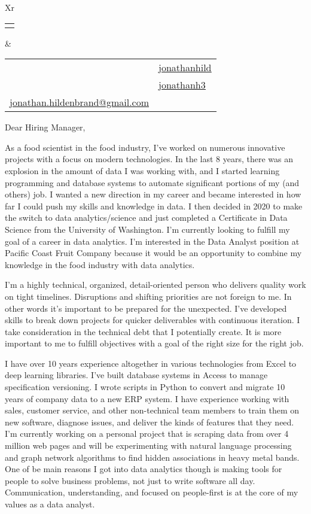 \documentclass[letterpaper,12pt]{article}[leftmargin=*]
\makeatletter
\def\fullname{Jonathan Hildenbrand}
\def\githubicon{\faGithub}
\def\githublink{https://github.com/jonathanhild}
\def\githubtext{jonathanhild}
\def\linkedinicon{\faLinkedin}
\def\linkedinlink{https://linkedin.com/in/jonathanh3}
\def\linkedintext{jonathanh3}
\def\phoneicon{\faPhone}
\def\phonetext{+1-971-409-0695}
\def\emailicon{\faEnvelope}
\def\emaillink{mailto:jonathan.hildenbrand+resume@gmail.com}
\def\emailtext{jonathan.hildenbrand@gmail.com}
\def\locationicon{\faMapMarker}
\def\locationtext{Portland, Oregon}
\def\targeticon{\faBinoculars}
\def\targettext{Local \& Remote}
\def\headertype{\doublecol} %
\def\location{\hspace{3pt}\locationicon \hspace{5pt}{\color{links}\locationtext}}
\def\target{\targeticon\hspace{3pt}{\color{links}\targettext}}
\def\phone{\phoneicon\hspace{3pt}{\color{links}{\phonetext}}}
\def\linkedin{\linkedinicon\hspace{3pt}\href{\linkedinlink}{\underline{\linkedintext}}}
\def\email{\emailicon\hspace{3pt}\href{\emaillink}{\underline{\emailtext}}}
\def\github{\githubicon\hspace{3pt}\href{\githublink}{\underline{\githubtext}}}
\newcommand{\doublecol}[6]{
  \begin{tabularx}{\textwidth}{Xr}
    {
      \begin{tabular}[c]{l}
        \fontsize{24}{34}\selectfont{\color{primary}{{\textbf{\fullname}}}}
      \end{tabular}
    } & {
      \begin{tabular}[c]{l@{\hspace{1.5em}} l}
        {\small#4} & {\small#1} \\
        {\small#5} & {\small#2} \\
        {\small#6} & {\small#3}
      \end{tabular}
    }
  \end{tabularx}
}
\makeatother
\begin{document}
\headertype{\github}{\linkedin}{\phone}{\location}{\target}{\email} %

\vspace{48pt}

Dear Hiring Manager,

\vspace{24pt}

\hspace{24pt}
As a food scientist in the food industry, I've worked on numerous innovative projects with a focus on modern technologies. In the last 8 years, there was an explosion in the amount of data I was working with, and I started learning programming and database systems to automate significant portions of my (and others) job. I wanted a new direction in my career and became interested in how far I could push my skills and knowledge in data. I then decided in 2020 to make the switch to data analytics/science and just completed a Certificate in Data Science from the University of Washington.
I'm currently looking to fulfill my goal of a career in data analytics.
I'm interested in the Data Analyst position at Pacific Coast Fruit Company because it would be an opportunity to combine my knowledge in the food industry with data analytics.

\vspace{12pt}

\hspace{24pt}
I'm a highly technical, organized, detail-oriented person who delivers quality work on tight timelines. Disruptions and shifting priorities are not foreign to me. In other words it's important to be prepared for the unexpected. I've developed skills to break down projects for quicker deliverables with continuous iteration. I take consideration in the technical debt that I potentially create. It is more important to me to fulfill objectives with a goal of the right size for the right job.

\vspace{12pt}

\hspace{24pt}
I have over 10 years experience altogether in various technologies from Excel to deep learning libraries. I've built database systems in Access to manage specification versioning. I wrote scripts in Python to convert and migrate 10 years of company data to a new ERP system. I have experience working with sales, customer service, and other non-technical team members to train them on new software, diagnose issues, and deliver the kinds of features that they need. I'm currently working on a personal project that is scraping data from over 4 million web pages and will be experimenting with natural language processing and graph network algorithms to find hidden associations in heavy metal bands. One of be main reasons I got into data analytics though is making tools for people to solve business problems, not just to write software all day. Communication, understanding, and focused on people-first is at the core of my values as a data analyst.
\end{document}
